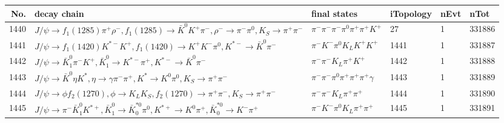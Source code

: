 \begin{table}[htbp] 
\begin{center}
\begin{small}
\begin{tabular}{rlllll}\hline\hline
 No. & decay chain & final states &  iTopology & nEvt & nTot \\\hline
1440&$J/\psi       \rightarrow f_{1}(1285)    \pi^{+}        \rho^{-}      , f_{1}(1285)     \rightarrow \bar{K}^{0}   K^{+}          \pi^{-}        , \rho^{-}       \rightarrow \pi^{-}        \pi^{0}        , K_{S}           \rightarrow \pi^{+}        \pi^{-}        $&$\pi^{-}        \pi^{-}        \pi^{-}        \pi^{0}        \pi^{+}        \pi^{+}        K^{+}          $&   27&    1&331886\\
1441&$J/\psi       \rightarrow f_{1}(1420)    K^{*-}         K^{+}          , f_{1}(1420)     \rightarrow K^{+}          K^{-}          \pi^{0}        , K^{*-}          \rightarrow \bar{K}^{0}   \pi^{-}        $&$\pi^{-}        K^{-}          \pi^{0}        K_{L}          K^{+}          K^{+}          $& 1441&    1&331887\\
1442&$J/\psi       \rightarrow \bar{K}_1^{0} \pi^{-}        K^{+}          , \bar{K}_1^{0}  \rightarrow K^{*-}         \pi^{+}        , K^{*-}          \rightarrow \bar{K}^{0}   \pi^{-}        $&$\pi^{-}        \pi^{-}        K_{L}          \pi^{+}        K^{+}          $& 1442&    1&331888\\
1443&$J/\psi       \rightarrow \bar{K}^{0}   \eta          K^{*}          , \eta           \rightarrow \gamma       \pi^{-}        \pi^{+}        , K^{*}           \rightarrow K^{0}          \pi^{0}        , K_{S}           \rightarrow \pi^{+}        \pi^{-}        $&$\pi^{-}        \pi^{-}        \pi^{0}        \pi^{+}        \pi^{+}        \pi^{+}        \gamma       $& 1443&    1&331889\\
1444&$J/\psi       \rightarrow \phi           f_{2}(1270)    , \phi            \rightarrow K_{L}          K_{S}          , f_{2}(1270)     \rightarrow \pi^{+}        \pi^{-}        , K_{S}           \rightarrow \pi^{+}        \pi^{-}        $&$\pi^{-}        \pi^{-}        K_{L}          \pi^{+}        \pi^{+}        $& 1444&    1&331890\\
1445&$J/\psi       \rightarrow \pi^{-}        \bar{K}_1^{0} K^{*+}         , \bar{K}_1^{0}  \rightarrow \bar{K}_0^{*0}\pi^{0}        , K^{*+}          \rightarrow K^{0}          \pi^{+}        , \bar{K}_0^{*0} \rightarrow K^{-}          \pi^{+}        $&$\pi^{-}        K^{-}          \pi^{0}        K_{L}          \pi^{+}        \pi^{+}        $& 1445&    1&331891\\

\end{tabular}
\end{small}
\end{center}
\end{table}
